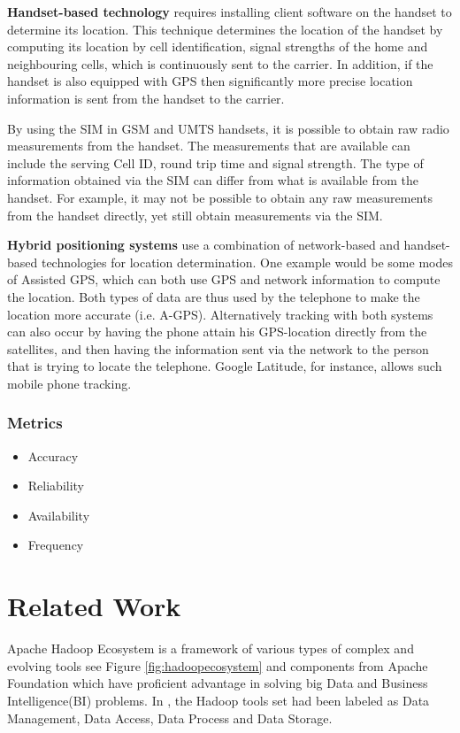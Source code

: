 \documentclass[11pt, oneside]{article}   	%
\begin{document}
\textbf{Handset-based technology} requires installing client software on the handset to determine its location. This technique determines the location of the handset by computing its location by cell identification, signal strengths of the home and neighbouring cells, which is continuously sent to the carrier. In addition, if the handset is also equipped with GPS then significantly more precise location information is sent from the handset to the carrier.

By using the SIM in GSM and UMTS handsets, it is possible to obtain raw radio measurements from the handset. The measurements that are available can include the serving Cell ID, round trip time and signal strength. The type of information obtained via the SIM can differ from what is available from the handset. For example, it may not be possible to obtain any raw measurements from the handset directly, yet still obtain measurements via the SIM.

\textbf{Hybrid positioning systems} use a combination of network-based and handset-based technologies for location determination. One example would be some modes of Assisted GPS, which can both use GPS and network information to compute the location. Both types of data are thus used by the telephone to make the location more accurate (i.e. A-GPS). Alternatively tracking with both systems can also occur by having the phone attain his GPS-location directly from the satellites, and then having the information sent via the network to the person that is trying to locate the telephone. Google Latitude, for instance, allows such mobile phone tracking.

\subsubsection{Metrics}
\begin{itemize}
\item Accuracy
\item Reliability
\item Availability
\item Frequency 
\end{itemize}

\section{Related Work}
Apache Hadoop Ecosystem is a framework of various types of complex and evolving tools see Figure \ref{fig:hadoopecosystem}  and components from Apache Foundation which have proficient advantage in solving big Data and Business Intelligence(BI) problems. In , the Hadoop tools set had been labeled as Data Management, Data Access, Data Process and Data Storage.
\end{document}
